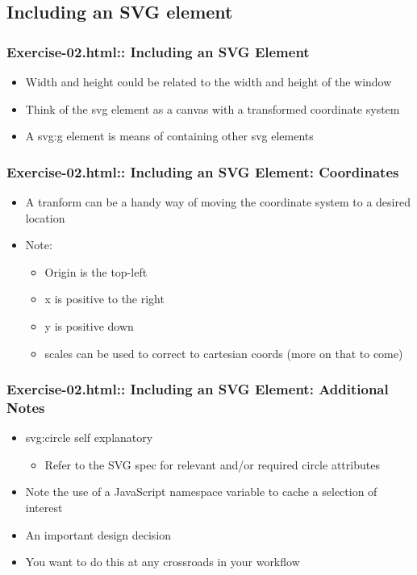 \documentclass{beamer}
\begin{document}
\subsection{Including an SVG element}


\begin{frame}
    \frametitle{Exercise-02.html:: Including an SVG Element}
    \begin{itemize}
    \item Width and height could be related to the width and height of the window
    \item Think of the svg element as a canvas with a transformed coordinate system
    \item A svg:g element is means of containing other svg elements
    \end{itemize}
\end{frame}



\begin{frame}
    \frametitle{Exercise-02.html:: Including an SVG Element: Coordinates}
    \begin{itemize}
    \item A tranform can be a handy way of moving the coordinate system to a desired location
    \item Note:
        \begin{itemize}
        \item Origin is the top-left
        \item x is positive to the right
        \item y is positive down
        \item scales can be used to correct to cartesian coords (more on that to come)
        \end{itemize}
    \end{itemize}
\end{frame}



\begin{frame}
    \frametitle{Exercise-02.html:: Including an SVG Element: Additional Notes}
    \begin{itemize}
    \item svg:circle self explanatory
        \begin{itemize}
        \item Refer to the SVG spec for relevant and/or required circle attributes
        \end{itemize}
    \item Note the use of a JavaScript namespace variable to cache a selection of interest
    \item An important design decision
    \item You want to do this at any crossroads in your workflow
    \end{itemize}
\end{frame}
\end{document}
